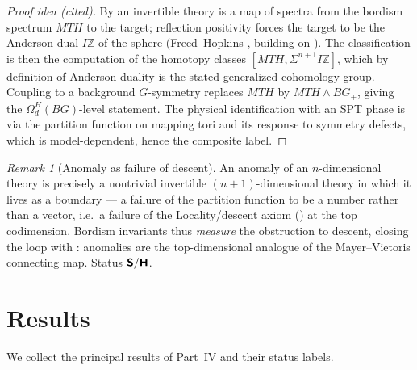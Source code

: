 \documentclass[12pt]{article}
\theoremstyle{definition}
\theoremstyle{remark}
\newtheorem{remark}[remark]{Remark}
\newcommand{\Zm}{\mathbb{Z}}
\newcommand{\Sfont}{\textnormal{\sffamily\bfseries S}}
\newcommand{\Hfont}{\textnormal{\sffamily\bfseries H}}
\begin{document}
\begin{proof}[Proof idea (cited)]
By  an invertible theory is a map of spectra from the
bordism spectrum $MTH$ to the target; reflection positivity forces the target to
be the Anderson dual $I\Zm$ of the sphere (Freed--Hopkins \cite{FreedHopkins},
building on \cite{Freed2014}). The classification is then the computation of the
homotopy classes $[MTH,\Sigma^{n+1}I\Zm]$, which by definition of Anderson duality
is the stated generalized cohomology group. Coupling to a background $G$-symmetry
replaces $MTH$ by $MTH\wedge BG_+$, giving the $\Omega^H_d(BG)$-level statement.
The physical identification with an SPT phase is via the partition function on
mapping tori and its response to symmetry defects, which is model-dependent, hence
the composite label.
\end{proof}

\begin{remark}[Anomaly as failure of descent]
\label{rem:anomaly}
An anomaly of an $n$-dimensional theory is precisely a nontrivial invertible
$(n+1)$-dimensional theory in which it lives as a boundary --- a failure of the
partition function to be a number rather than a vector, i.e.\ a failure of the
Locality/descent axiom () at the top codimension. Bordism
invariants thus \emph{measure} the obstruction to descent, closing the loop with
: anomalies are the top-dimensional analogue of the
Mayer--Vietoris connecting map. Status $\Sfont/\Hfont$.
\end{remark}

\section{Results}
\label{sec:results}

We collect the principal results of Part~IV and their status labels.
\end{document}
